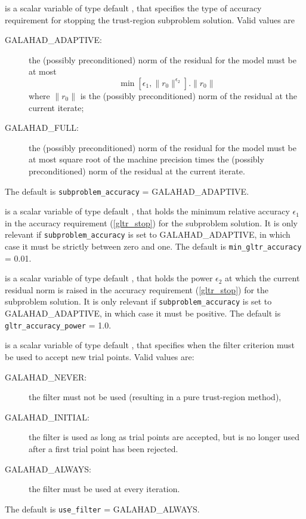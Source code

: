 \documentclass{galahad}
\newcommand{\sym}{\sf\small}
\begin{document}
\begin{description}
 is a scalar variable of type default \integer,
that specifies the type of accuracy requirement for stopping the trust-region
subproblem solution. Valid values are
\begin{description}
\item[\sym GALAHAD\_ADAPTIVE:] the (possibly preconditioned) norm of the
residual for the model must be at most
\begin{equation}\label{gltr_stop}
\min\left[\epsilon_1,\| r_0 \|^{\epsilon_2}\right] . \|r_0\|
\end{equation}
where $\|r_0\|$ is the (possibly preconditioned) norm of the residual at the
current iterate;
\item[\sym GALAHAD\_FULL:] the (possibly preconditioned) norm of the residual
for the model must be at most square root of the machine precision times
the (possibly preconditioned) norm of the residual at the current iterate.
\end{description}
The default is {\tt subproblem\_accuracy} = {\sym GALAHAD\_ADAPTIVE}.

 is a scalar variable of type default \realdp, that
holds the minimum relative accuracy $\epsilon_1$ in the accuracy
requirement (\ref{gltr_stop}) for the subproblem solution.
It is only relevant if {\tt subproblem\_accuracy} is set
to {\sym GALAHAD\_ADAPTIVE}, in which case it must be strictly between zero
and one.
The default is {\tt min\_gltr\_accuracy} = 0.01.

 is a scalar variable of type default \realdp, that
holds the power $\epsilon_2$ at which the current residual norm is raised in
the accuracy requirement (\ref{gltr_stop}) for the subproblem solution.
It is only relevant if {\tt subproblem\_accuracy} is set
to {\sym GALAHAD\_ADAPTIVE}, in which case it must be positive.
The default is {\tt gltr\_accuracy\_power} = 1.0.

 is a scalar variable of type default \integer, that
specifies when the filter criterion must be used to accept new trial points.
Valid values are:
\begin{description}
\item[\sym GALAHAD\_NEVER:] the filter must not be used (resulting in a pure
trust-region method),
\item[\sym GALAHAD\_INITIAL:] the filter is used as long as trial points are
accepted, but is no longer used after a first trial point has been rejected.
\item[\sym GALAHAD\_ALWAYS:] the filter must be used at every iteration.
\end{description}
The default is {\tt use\_filter} = {\sym GALAHAD\_ALWAYS}.


\end{description}
\end{document}
